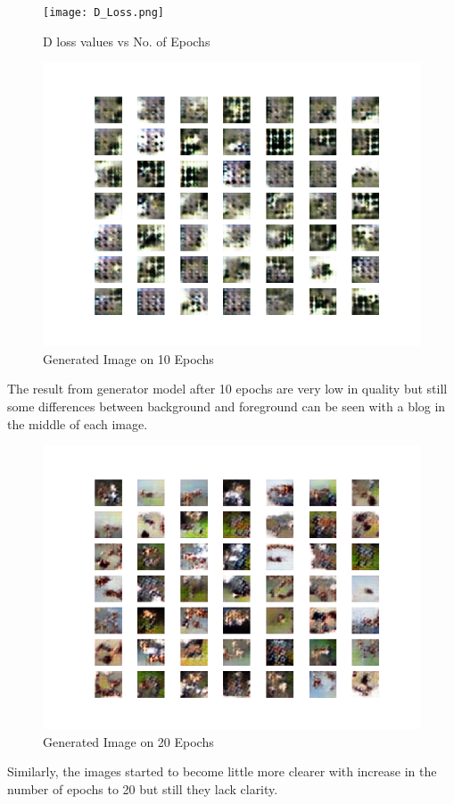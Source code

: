 \documentclass{article}
\begin{document}
\begin{figure}[H]
    \centering
    \texttt{[image: D\_Loss.png]}
    \caption{D loss values vs No. of Epochs}
    \label{fig:compute}
\end{figure}


\begin{figure}[H]
    \centering
    \includegraphics[width=\textwidth]{e10.png}
    \caption{Generated Image on 10 Epochs}
    \label{fig:compute}
\end{figure}
The result from generator model after 10 epochs are very low in quality but still some differences between background and foreground can be seen with a blog in the middle of each image. 


\begin{figure}[H]
    \centering
    \includegraphics[width=\textwidth]{e20.png}
    \caption{Generated Image on 20 Epochs}
    \label{fig:compute}
\end{figure}
Similarly, the images started to become little more clearer with increase in the number of epochs to 20 but still they lack clarity.
\end{document}
